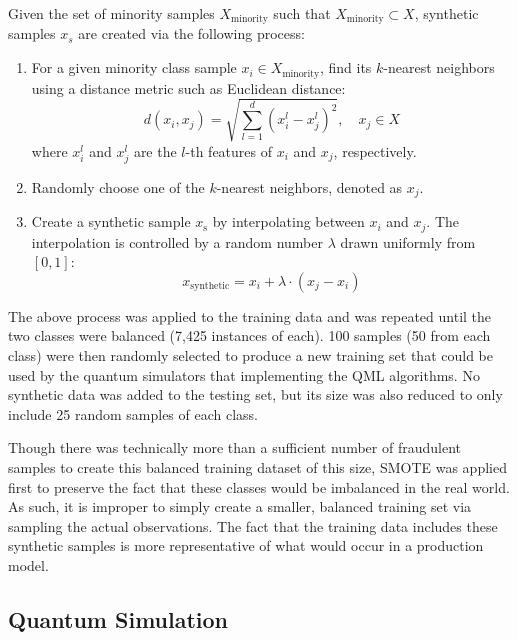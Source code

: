 \documentclass[11pt, oneside]{article}   	%
\begin{document}
Given the set of minority samples $X_{\text{minority}}$ such that $X_{\text{minority}} \subset X$, synthetic samples $x_s$ are created via the following process:


\begin{enumerate}
    \item For a given minority class sample $x_i \in X_{\text{minority}}$, find its $k$-nearest neighbors using a distance metric such as Euclidean distance:
    	\begin{equation}
         d(x_i, x_j) = \sqrt{\sum_{l=1}^d (x_i^l - x_j^l)^2}, \quad x_j \in X
    	\end{equation}
    where $x_i^l$ and $x_j^l$ are the $l $-th features of $x_i$ and $ x_j$, respectively.
    \item Randomly choose one of the $k$-nearest neighbors, denoted as $x_j$.
    \item Create a synthetic sample $x_{\text{s}}$ by interpolating between $x_i$ and $x_j$. The interpolation is controlled by a random number $\lambda$ drawn uniformly from $[0, 1]$:
    	\begin{equation}
    	x_{\text{synthetic}} = x_i + \lambda \cdot (x_j - x_i)
   	\end{equation}
\end{enumerate}

The above process was applied to the training data and was repeated until the two classes were balanced (7,425 instances of each). 100 samples (50 from each class) were then randomly selected to produce a new training set that could be used by the quantum simulators that implementing the QML algorithms. No synthetic data was added to the testing set, but its size was also reduced to only include 25 random samples of each class.

Though there was technically more than a sufficient number of fraudulent samples to create this balanced training dataset of this size, SMOTE was applied first to preserve the fact that these classes would be imbalanced in the real world. As such, it is improper to simply create a smaller, balanced training set via sampling the actual observations. The fact that the training data includes these synthetic samples is more representative of what would occur in a production model. 




\subsection{Quantum Simulation}
\end{document}
